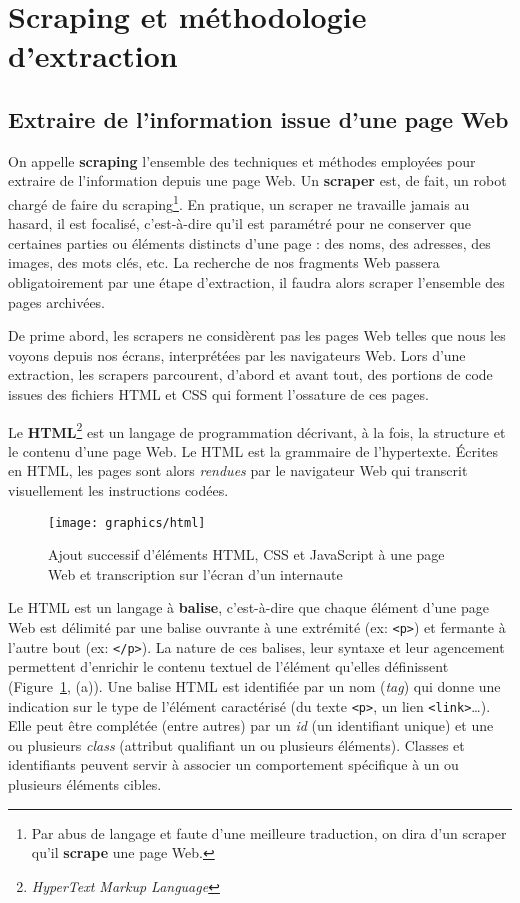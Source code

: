 \documentclass[symmetric,justified,marginals=raggedouter]{tufte-book}
\begin{document}
\section{Scraping et méthodologie d'extraction}
\label{sec:5_scraping}

\subsection{Extraire de l'information issue d'une page Web}

\noindent On appelle \textbf{scraping} l'ensemble des techniques et méthodes employées pour extraire de l'information depuis une page Web. Un \textbf{scraper} est, de fait, un robot chargé de faire du scraping\footnote{\RaggedOuter Par abus de langage et faute d'une meilleure traduction, on dira d'un scraper qu'il \textbf{scrape} une page Web.}. En pratique, un scraper ne travaille jamais au hasard, il est focalisé, c'est-à-dire qu'il est paramétré pour ne conserver que certaines parties ou éléments distincts d'une page : des noms, des adresses, des images, des mots clés, etc. La recherche de nos fragments Web passera obligatoirement par une étape d'extraction, il faudra alors scraper l'ensemble des pages archivées.

De prime abord, les scrapers ne considèrent pas les pages Web telles que nous les voyons depuis nos écrans, interprétées par les navigateurs Web. Lors d'une extraction, les scrapers parcourent, d'abord et avant tout, des portions de code issues des fichiers HTML et CSS qui forment l'ossature de ces pages. 

Le \textbf{HTML}\footnote{\RaggedOuter \textit{HyperText Markup Language}} est un langage de programmation décrivant, à la fois, la structure et le contenu d'une page Web. Le HTML est la grammaire de l'hypertexte. Écrites en HTML, les pages sont alors \textit{rendues} par le navigateur Web qui transcrit visuellement les instructions codées.  

\begin{figure}%
  \texttt{[image: graphics/html]}
  \caption{Ajout successif d'éléments HTML, CSS et JavaScript à une page Web et transcription sur l'écran d'un internaute}
  \label{fig:html}
\end{figure}

\noindent Le HTML est un langage à \textbf{balise}, c'est-à-dire que chaque élément d'une page Web est délimité par une balise ouvrante à une extrémité (ex: \texttt{<p>}) et fermante à l'autre bout (ex: \texttt{</p>}). La nature de ces balises, leur syntaxe et leur agencement permettent d'enrichir le contenu textuel de l'élément qu'elles définissent (Figure~\ref{fig:html}, (a)). Une balise HTML est identifiée par un nom (\textit{tag}) qui donne une indication sur le type de l'élément caractérisé (du texte \texttt{<p>}, un lien \texttt{<link>}\ldots{}). Elle peut être complétée (entre autres) par un \textit{id} (un identifiant unique) et une ou plusieurs \textit{class} (attribut qualifiant un ou plusieurs éléments). Classes et identifiants peuvent servir à associer un comportement spécifique à un ou plusieurs éléments cibles.
\end{document}
